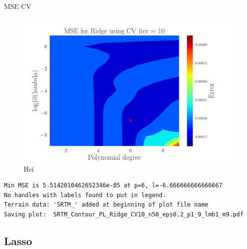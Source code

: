 \documentclass[reprint,english,notitlepage,aps,nobalancelastpage,nofootinbib]{revtex4-1}  %
\begin{document}
MSE CV
\begin{figure}[h]
	\includegraphics[width=\linewidth]{SRTM_Contour_PL_Ridge_CV10_n50_eps0.2_p1_9_lmb1_m9.pdf}
	\caption{Hei}
	\label{fig:terrain_Ridge_MSE_CV}
\end{figure}
\begin{verbatim}
Min MSE is 5.5142010462652346e-05 at p=6, l=-6.666666666666667
No handles with labels found to put in legend.
Terrain data: 'SRTM_' added at beginning of plot file name
Saving plot:  SRTM_Contour_PL_Ridge_CV10_n50_eps0.2_p1_9_lmb1_m9.pdf
\end{verbatim}

\subsection*{Lasso}
\end{document}
